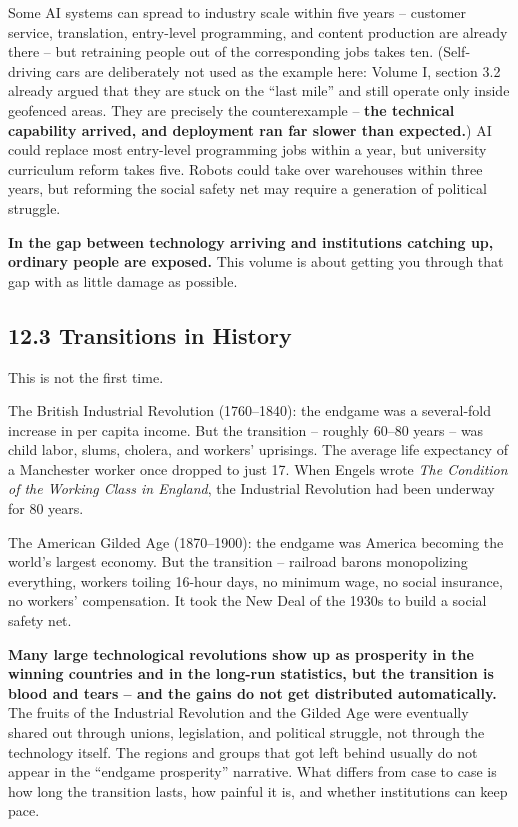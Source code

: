 \documentclass[11pt,a4paper]{article}
\begin{document}
Some AI systems can spread to industry scale within five years -- customer service, translation, entry-level programming, and content production are already there -- but retraining people out of the corresponding jobs takes ten. (Self-driving cars are deliberately not used as the example here: Volume I, section 3.2 already argued that they are stuck on the ``last mile'' and still operate only inside geofenced areas. They are precisely the counterexample -- \textbf{the technical capability arrived, and deployment ran far slower than expected.}) AI could replace most entry-level programming jobs within a year, but university curriculum reform takes five. Robots could take over warehouses within three years, but reforming the social safety net may require a generation of political struggle.

\textbf{In the gap between technology arriving and institutions catching up, ordinary people are exposed.} This volume is about getting you through that gap with as little damage as possible.

\subsection{12.3 Transitions in History}

This is not the first time.

The British Industrial Revolution (1760--1840): the endgame was a several-fold increase in per capita income. But the transition -- roughly 60--80 years -- was child labor, slums, cholera, and workers' uprisings. The average life expectancy of a Manchester worker once dropped to just 17. When Engels wrote \textit{The Condition of the Working Class in England}, the Industrial Revolution had been underway for 80 years.

The American Gilded Age (1870--1900): the endgame was America becoming the world's largest economy. But the transition -- railroad barons monopolizing everything, workers toiling 16-hour days, no minimum wage, no social insurance, no workers' compensation. It took the New Deal of the 1930s to build a social safety net.

\textbf{Many large technological revolutions show up as prosperity in the winning countries and in the long-run statistics, but the transition is blood and tears -- and the gains do not get distributed automatically.} The fruits of the Industrial Revolution and the Gilded Age were eventually shared out through unions, legislation, and political struggle, not through the technology itself. The regions and groups that got left behind usually do not appear in the ``endgame prosperity'' narrative. What differs from case to case is how long the transition lasts, how painful it is, and whether institutions can keep pace.
\end{document}
